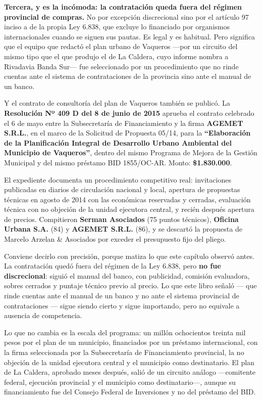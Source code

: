 \textbf{Tercera, y es la incómoda: la contratación queda fuera del régimen provincial de compras.} No por excepción discrecional sino por el artículo 97 inciso a de la propia Ley 6.838, que excluye lo financiado por organismos internacionales cuando se siguen sus pautas. Es legal y es habitual. Pero significa que el equipo que redactó el plan urbano de Vaqueros ---por un circuito del mismo tipo que el que produjo el de La Caldera, cuyo informe nombra a Rivadavia Banda Sur--- fue seleccionado por un procedimiento que no rinde cuentas ante el sistema de contrataciones de la provincia sino ante el manual de un banco.

\begin{cautela}
Y el contrato de consultoría del plan de Vaqueros también se publicó. La \textbf{Resolución Nº 409 D del 8 de junio de 2015} aprueba el contrato celebrado el 6 de mayo entre la Subsecretaría de Financiamiento y la firma \textbf{AGEMET S.R.L.}, en el marco de la Solicitud de Propuesta 05/14, para la \textbf{``Elaboración de la Planificación Integral de Desarrollo Urbano Ambiental del Municipio de Vaqueros''}, dentro del mismo Programa de Mejora de la Gestión Municipal y del mismo préstamo BID 1855/OC-AR. Monto: \textbf{\$1.830.000}.

El expediente documenta un procedimiento competitivo real: invitaciones publicadas en diarios de circulación nacional y local, apertura de propuestas técnicas en agosto de 2014 con las económicas reservadas y cerradas, evaluación técnica con no objeción de la unidad ejecutora central, y recién después apertura de precios. Compitieron \textbf{Serman Asociados} (75 puntos técnicos), \textbf{Oficina Urbana S.A.} (84) y \textbf{AGEMET S.R.L.} (86), y se descartó la propuesta de Marcelo Arzelan \& Asociados por exceder el presupuesto fijo del pliego.

Conviene decirlo con precisión, porque matiza lo que este capítulo observó antes. La contratación quedó fuera del régimen de la Ley 6.838, pero \textbf{no fue discrecional}: siguió el manual del banco, con publicidad, comisión evaluadora, sobres cerrados y puntaje técnico previo al precio. Lo que este libro señaló --- que rinde cuentas ante el manual de un banco y no ante el sistema provincial de contrataciones --- sigue siendo cierto y sigue importando, pero no equivale a ausencia de competencia.

Lo que no cambia es la escala del programa: un millón ochocientos treinta mil pesos por el plan de un municipio, financiados por un préstamo internacional, con la firma seleccionada por la Subsecretaría de Financiamiento provincial, la no objeción de la unidad ejecutora central y el municipio como destinatario. El plan de La Caldera, aprobado meses después, salió de un circuito análogo ---comitente federal, ejecución provincial y el municipio como destinatario---, aunque su financiamiento fue del Consejo Federal de Inversiones y no del préstamo del BID.
\end{cautela}


